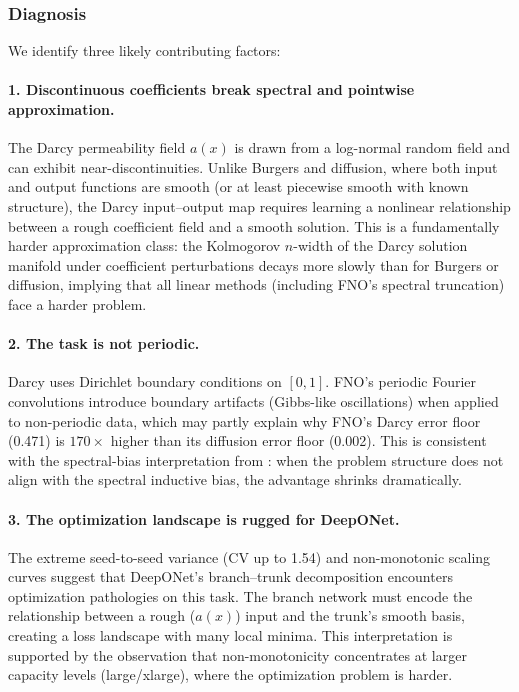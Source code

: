 \documentclass[11pt]{article}
\begin{document}
\subsubsection{Diagnosis}

We identify three likely contributing factors:

\paragraph{1. Discontinuous coefficients break spectral and
  pointwise approximation.}
The Darcy permeability field $a(x)$ is drawn from a log-normal
random field and can exhibit near-discontinuities. Unlike Burgers
and diffusion, where both input and output functions are smooth
(or at least piecewise smooth with known structure), the Darcy
input--output map requires learning a nonlinear relationship between
a rough coefficient field and a smooth solution.
This is a fundamentally harder approximation class: the
Kolmogorov $n$-width of the Darcy solution manifold under
coefficient perturbations decays more slowly than for Burgers
or diffusion, implying that all linear methods (including FNO's
spectral truncation) face a harder problem.

\paragraph{2. The task is not periodic.}
Darcy uses Dirichlet boundary conditions on $[0, 1]$. FNO's
periodic Fourier convolutions introduce boundary artifacts
(Gibbs-like oscillations) when applied to non-periodic data,
which may partly explain why FNO's Darcy error floor (0.471) is
$170\times$ higher than its diffusion error floor (0.002).
This is consistent with the spectral-bias interpretation from
: when the problem structure does not
align with the spectral inductive bias, the advantage shrinks
dramatically.

\paragraph{3. The optimization landscape is rugged for DeepONet.}
The extreme seed-to-seed variance (CV up to 1.54) and
non-monotonic scaling curves suggest that DeepONet's
branch--trunk decomposition encounters optimization pathologies
on this task.
The branch network must encode the relationship between a
rough ($a(x)$) input and the trunk's smooth basis, creating a
loss landscape with many local minima.
This interpretation is supported by the observation that
non-monotonicity concentrates at larger capacity levels
(large/xlarge), where the optimization problem is harder.
\end{document}
